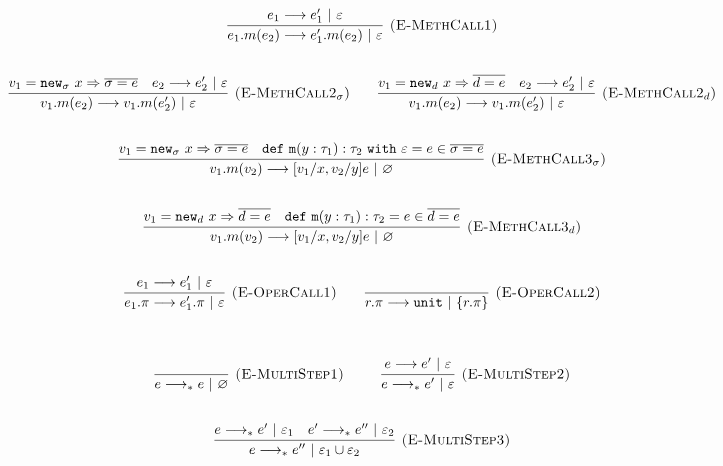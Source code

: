\documentclass{llncs}
\newcommand{\keywadj}[1]{\mathtt{#1}}
\newcommand{\keyw}[1]{\keywadj{#1}~}
\newcommand{\newd}[0]{
	\keywadj{new}_d~x \Rightarrow \overline{d = e}
}
\newcommand{\newsig}[0]{
	\keywadj{new}_\sigma~x \Rightarrow \overline{\sigma = e}
}
\begin{document}
\[
\begin{array}{c}

	\infer[\textsc{(E-MethCall1)}]
		{e_1.m(e_2) \longrightarrow e_1'.m(e_2)~|~\varepsilon}
		{e_1 \longrightarrow e_1'~|~\varepsilon} \\[5ex]

	\infer[\textsc{(E-MethCall2$_{\sigma}$)}]
		{v_1.m(e_2) \longrightarrow v_1.m(e_2')~|~\varepsilon}
		{v_1 = \newsig & e_2 \longrightarrow e_2'~|~\varepsilon} ~~~~~~
		
	\infer[\textsc{(E-MethCall2$_d$)}]
		{v_1.m(e_2) \longrightarrow v_1.m(e_2')~|~\varepsilon}
		{v_1 = \newd & e_2 \longrightarrow e_2'~|~\varepsilon}\\[5ex]
				
	\infer[\textsc{(E-MethCall3$_{\sigma}$)}]
		{v_1.m(v_2)
			\longrightarrow
		 [v_1/x, v_2/y]e~|~\varnothing}
  		{v_1 = \newsig & \keywadj{def~m}(y: \tau_1) : \tau_2~\keyw{with} \varepsilon = e \in \overline {\sigma = e}} \\[5ex]

	\infer[\textsc{(E-MethCall3$_d$)}]
		{v_1.m(v_2)
			\longrightarrow
		 [v_1/x, v_2/y]e~|~\varnothing}
  		{v_1 = \newd & \keywadj{def~m}(y: \tau_1) : \tau_2 = e \in \overline {d = e}} \\[5ex]

	\infer[\textsc{(E-OperCall1)}]
		{e_1.\pi
			\longrightarrow
		 e_1'.\pi~|~\varepsilon}
		{e_1 \longrightarrow e_1'~|~\varepsilon}
~~~~~~

			\infer[\textsc{(E-OperCall2)}]
		{r.\pi
			\longrightarrow
		 \keywadj{unit}~|~\{r.\pi\}}
		{} \\[5ex]
			
\end{array}
\]
\noindent
{}

\[
\begin{array}{c}

	\infer[\textsc{(E-MultiStep1)}]
	{e \longrightarrow_* e~|~\varnothing}
	{} ~~~~~~~~
	
	\infer[\textsc{(E-MultiStep2)}]
	{e \longrightarrow_* e'~|~\varepsilon}
	{e \longrightarrow e'~|~\varepsilon} \\[5ex]

	\infer[\textsc{(E-MultiStep3)}]
	{e \longrightarrow_* e''~|~\varepsilon_1 \cup \varepsilon_2}
	{e \longrightarrow_* e'~|~\varepsilon_1 & e' \longrightarrow_* e''~|~\varepsilon_2}

\end{array}
\]
\end{document}
